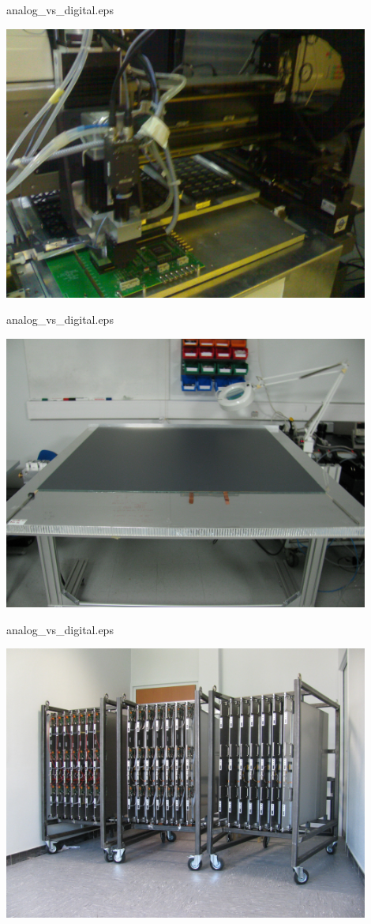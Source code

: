 \documentclass[10pt]{beamer}
\begin{document}
\begin{frame}{analog\_vs\_digital.eps}
    \centerline{\includegraphics[width=0.9\textwidth]{images/ConstructionGantry}}
\end{frame}
\begin{frame}{analog\_vs\_digital.eps}
    \centerline{\includegraphics[width=0.9\textwidth]{images/ConstructionRPC}}
\end{frame}
\begin{frame}{analog\_vs\_digital.eps}
    \centerline{\includegraphics[width=0.9\textwidth]{images/ConstructionRack}}
\end{frame}
\end{document}
